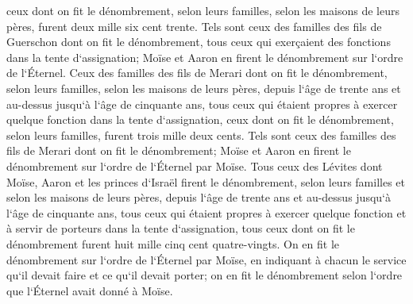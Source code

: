 \verse ceux dont on fit le dénombrement, selon leurs familles, selon les maisons de leurs pères, furent deux mille six cent trente. 
\verse Tels sont ceux des familles des fils de Guerschon dont on fit le dénombrement, tous ceux qui exerçaient des fonctions dans la tente d`assignation; Moïse et Aaron en firent le dénombrement sur l`ordre de l`Éternel. 
\verse Ceux des familles des fils de Merari dont on fit le dénombrement, selon leurs familles, selon les maisons de leurs pères, 
\verse depuis l`âge de trente ans et au-dessus jusqu`à l`âge de cinquante ans, tous ceux qui étaient propres à exercer quelque fonction dans la tente d`assignation, 
\verse ceux dont on fit le dénombrement, selon leurs familles, furent trois mille deux cents. 
\verse Tels sont ceux des familles des fils de Merari dont on fit le dénombrement; Moïse et Aaron en firent le dénombrement sur l`ordre de l`Éternel par Moïse. 
\verse Tous ceux des Lévites dont Moïse, Aaron et les princes d`Israël firent le dénombrement, selon leurs familles et selon les maisons de leurs pères, 
\verse depuis l`âge de trente ans et au-dessus jusqu`à l`âge de cinquante ans, tous ceux qui étaient propres à exercer quelque fonction et à servir de porteurs dans la tente d`assignation, 
\verse tous ceux dont on fit le dénombrement furent huit mille cinq cent quatre-vingts. 
\verse On en fit le dénombrement sur l`ordre de l`Éternel par Moïse, en indiquant à chacun le service qu`il devait faire et ce qu`il devait porter; on en fit le dénombrement selon l`ordre que l`Éternel avait donné à Moïse. 

